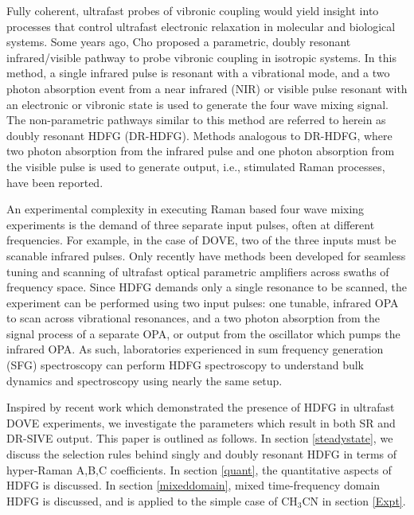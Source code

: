 \documentclass[aip, jcp, reprint, twocolumn]{revtex4-2}
\begin{document}
Fully coherent, ultrafast probes of vibronic coupling would yield insight into processes that control ultrafast electronic relaxation in molecular and biological systems. \cite{Bredenbeck2015, Arsenault2021}
Some years ago, Cho proposed a parametric, doubly resonant infrared/visible pathway to probe vibronic coupling in isotropic systems. \cite{Cho2001}
In this method, a single infrared pulse is resonant with a vibrational mode, and a two photon absorption event from a near infrared (NIR) or visible pulse resonant with an electronic or vibronic state is used to generate the four wave mixing signal.
The non-parametric pathways similar to this method are referred to herein as doubly resonant HDFG (DR-HDFG).
Methods analogous to DR-HDFG, where two photon absorption from the infrared pulse and one photon absorption from the visible pulse is used to generate output, i.e., stimulated Raman processes, have been reported. \cite{RN301, RN120} 

An experimental complexity in executing Raman based four wave mixing experiments is the demand of three separate input pulses, often at different frequencies.
For example, in the case of DOVE, two of the three inputs must be scanable infrared pulses. \cite{RN345} 
Only recently have methods been developed for seamless tuning and scanning of ultrafast optical parametric amplifiers across swaths of frequency space. \cite{RN162, McDonnell2024, SkyeOPA, KyleOPA}
Since HDFG demands only a single resonance to be scanned, the experiment can be performed using two input pulses: one tunable, infrared OPA to scan across vibrational resonances, and a two photon absorption from the signal process of a separate OPA, or output from the oscillator which pumps the infrared OPA. \cite{Wang2021}
As such, laboratories experienced in sum frequency generation (SFG) spectroscopy can perform HDFG spectroscopy to understand bulk dynamics and spectroscopy using nearly the same setup.\cite{Shen1987_CPL}

Inspired by recent work which demonstrated the presence of HDFG in ultrafast DOVE experiments,\cite{McDonnell2024} we investigate the parameters which result in both SR and DR-SIVE output. \cite{Cho2000, Bonn2024}
This paper is outlined as follows.
In section \ref{steadystate}, we discuss the selection rules behind singly and doubly resonant HDFG in terms of hyper-Raman A,B,C coefficients.
In section \ref{quant}, the quantitative aspects of HDFG is discussed.
In section \ref{mixeddomain}, mixed time-frequency domain HDFG is discussed, and is applied to the simple case of CH$_3$CN in section \ref{Expt}. 
\end{document}
